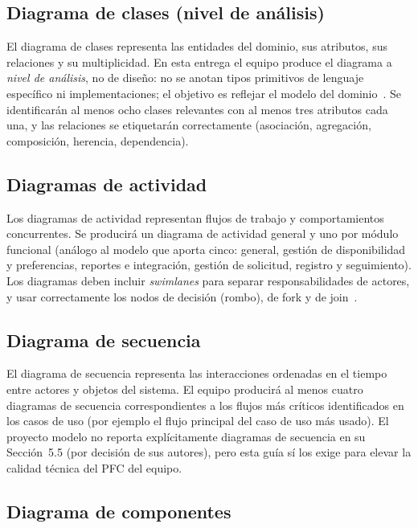 \documentclass[11pt,a4paper]{article}
\begin{document}
\subsection{Diagrama de clases (nivel de an\'alisis)}

El diagrama de clases representa las entidades del dominio, sus atributos, sus relaciones y su multiplicidad. En esta entrega el equipo produce el diagrama a \emph{nivel de an\'alisis}, no de dise\~no: no se anotan tipos primitivos de lenguaje espec\'ifico ni implementaciones; el objetivo es reflejar el modelo del dominio~\cite{fowler2018uml,larman2003uml}. Se identificar\'an al menos ocho clases relevantes con al menos tres atributos cada una, y las relaciones se etiquetar\'an correctamente (asociaci\'on, agregaci\'on, composici\'on, herencia, dependencia).

\subsection{Diagramas de actividad}

Los diagramas de actividad representan flujos de trabajo y comportamientos concurrentes. Se producir\'a un diagrama de actividad general y uno por m\'odulo funcional (an\'alogo al modelo que aporta cinco: general, gesti\'on de disponibilidad y preferencias, reportes e integraci\'on, gesti\'on de solicitud, registro y seguimiento). Los diagramas deben incluir \emph{swimlanes} para separar responsabilidades de actores, y usar correctamente los nodos de decisi\'on (rombo), de fork y de join~\cite{ahmad2019activity,paech1999activity}.

\subsection{Diagrama de secuencia}

El diagrama de secuencia representa las interacciones ordenadas en el tiempo entre actores y objetos del sistema. El equipo producir\'a al menos cuatro diagramas de secuencia correspondientes a los flujos m\'as cr\'iticos identificados en los casos de uso (por ejemplo el flujo principal del caso de uso m\'as usado). El proyecto modelo no reporta expl\'icitamente diagramas de secuencia en su Secci\'on~5.5 (por decisi\'on de sus autores), pero esta gu\'ia s\'i los exige para elevar la calidad t\'ecnica del PFC del equipo.

\subsection{Diagrama de componentes}
\end{document}
